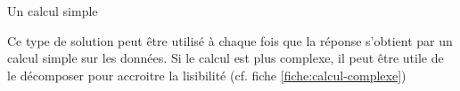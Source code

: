 \begin{Fiche}{Un calcul simple}

	Ce type de solution peut être utilisé à chaque fois
	que la réponse s’obtient par un calcul simple sur les données.
	Si le calcul est plus complexe, 
	il peut être utile de le décomposer pour accroitre la lisibilité
	(cf. fiche \vref{fiche:calcul-complexe}) 
	
\end{Fiche}
